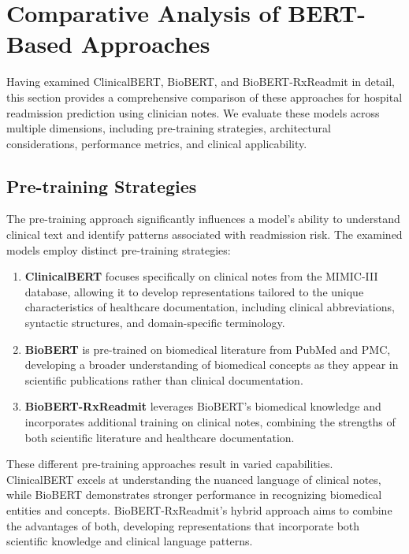\documentclass[3p,times,procedia]{elsarticle}
\begin{document}
\section{Comparative Analysis of BERT-Based Approaches}\label{comparative_analysis}

Having examined ClinicalBERT, BioBERT, and BioBERT-RxReadmit in detail, this section provides a comprehensive comparison of these approaches for hospital readmission prediction using clinician notes. We evaluate these models across multiple dimensions, including pre-training strategies, architectural considerations, performance metrics, and clinical applicability.

\subsection{Pre-training Strategies}

The pre-training approach significantly influences a model's ability to understand clinical text and identify patterns associated with readmission risk. The examined models employ distinct pre-training strategies:

\begin{enumerate}
    \item \textbf{ClinicalBERT} focuses specifically on clinical notes from the MIMIC-III database, allowing it to develop representations tailored to the unique characteristics of healthcare documentation, including clinical abbreviations, syntactic structures, and domain-specific terminology.
    
    \item \textbf{BioBERT} is pre-trained on biomedical literature from PubMed and PMC, developing a broader understanding of biomedical concepts as they appear in scientific publications rather than clinical documentation.
    
    \item \textbf{BioBERT-RxReadmit} leverages BioBERT's biomedical knowledge and incorporates additional training on clinical notes, combining the strengths of both scientific literature and healthcare documentation.
\end{enumerate}

These different pre-training approaches result in varied capabilities. ClinicalBERT excels at understanding the nuanced language of clinical notes, while BioBERT demonstrates stronger performance in recognizing biomedical entities and concepts. BioBERT-RxReadmit's hybrid approach aims to combine the advantages of both, developing representations that incorporate both scientific knowledge and clinical language patterns.
\end{document}
